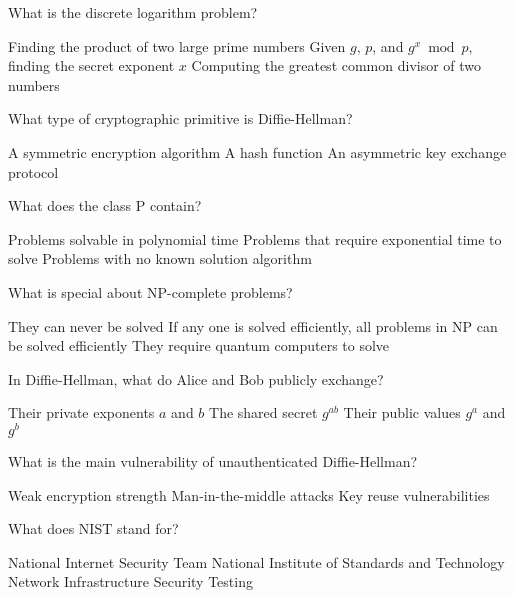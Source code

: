 \documentclass[10pt,a4paper,american]{exam}
\begin{document}
\begin{questions}
	\question What is the discrete logarithm problem?
	\begin{randomizechoices}
		\choice Finding the product of two large prime numbers
		\CorrectChoice Given $g$, $p$, and $g^x \bmod p$, finding the secret exponent $x$
		\choice Computing the greatest common divisor of two numbers
	\end{randomizechoices}

	\question What type of cryptographic primitive is Diffie-Hellman?
	\begin{randomizechoices}
		\choice A symmetric encryption algorithm
		\choice A hash function
		\CorrectChoice An asymmetric key exchange protocol
	\end{randomizechoices}

	\question What does the class P contain?
	\begin{randomizechoices}
		\CorrectChoice Problems solvable in polynomial time
		\choice Problems that require exponential time to solve
		\choice Problems with no known solution algorithm
	\end{randomizechoices}

	\question What is special about NP-complete problems?
	\begin{randomizechoices}
		\choice They can never be solved
		\CorrectChoice If any one is solved efficiently, all problems in NP can be solved efficiently
		\choice They require quantum computers to solve
	\end{randomizechoices}

	\question In Diffie-Hellman, what do Alice and Bob publicly exchange?
	\begin{randomizechoices}
		\choice Their private exponents $a$ and $b$
		\choice The shared secret $g^{ab}$
		\CorrectChoice Their public values $g^a$ and $g^b$
	\end{randomizechoices}

	\question What is the main vulnerability of unauthenticated Diffie-Hellman?
	\begin{randomizechoices}
		\choice Weak encryption strength
		\CorrectChoice Man-in-the-middle attacks
		\choice Key reuse vulnerabilities
	\end{randomizechoices}

	\question What does NIST stand for?
	\begin{randomizechoices}
		\choice National Internet Security Team
		\CorrectChoice National Institute of Standards and Technology
		\choice Network Infrastructure Security Testing
	\end{randomizechoices}


\end{questions}
\end{document}
